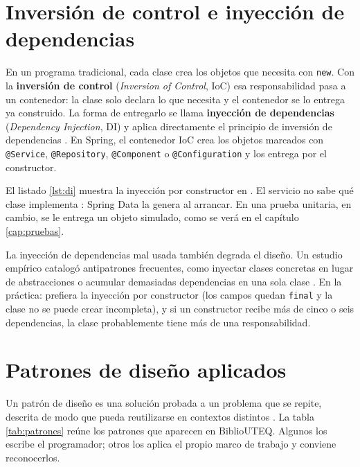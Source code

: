 \section{Inversión de control e inyección de dependencias}

En un programa tradicional, cada clase crea los objetos que necesita con \texttt{new}. Con la \textbf{inversión de control} (\emph{Inversion of Control}, IoC) esa responsabilidad pasa a un contenedor: la clase solo declara lo que necesita y el contenedor se lo entrega ya construido. La forma de entregarlo se llama \textbf{inyección de dependencias} (\emph{Dependency Injection}, DI) y aplica directamente el principio de inversión de dependencias \cite{martin2017clean}. En Spring, el contenedor IoC crea los objetos marcados con \texttt{@Service}, \texttt{@Repository}, \texttt{@Component} o \texttt{@Configuration} y los entrega por el constructor.

El listado \ref{lst:di} muestra la inyección por constructor en . El servicio no sabe qué clase implementa : Spring Data la genera al arrancar. En una prueba unitaria, en cambio, se le entrega un objeto simulado, como se verá en el capítulo \ref{cap:pruebas}.



\begin{avisoBox}[title={Antipatrones de inyección de dependencias}]
	La inyección de dependencias mal usada también degrada el diseño. Un estudio empírico catalogó antipatrones frecuentes, como inyectar clases concretas en lugar de abstracciones o acumular demasiadas dependencias en una sola clase \cite{laigner2022cataloging}. En la práctica: prefiera la inyección por constructor (los campos quedan \texttt{final} y la clase no se puede crear incompleta), y si un constructor recibe más de cinco o seis dependencias, la clase probablemente tiene más de una responsabilidad.
\end{avisoBox}

\section{Patrones de diseño aplicados}

Un patrón de diseño es una solución probada a un problema que se repite, descrita de modo que pueda reutilizarse en contextos distintos \cite{gamma1994design}. La tabla \ref{tab:patrones} reúne los patrones que aparecen en BiblioUTEQ. Algunos los escribe el programador; otros los aplica el propio marco de trabajo y conviene reconocerlos.

